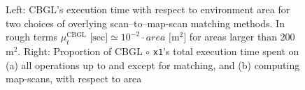 \begin{figure}
  \vspace{0.5cm}
  
  \vspace{0.6cm}
  \caption{\small Left: CBGL's execution time with respect to environment area
           for two choices of overlying scan--to--map-scan matching methods. In
           rough terms $\mu_t^{\text{CBGL}} \text{ [sec]} \simeq 10^{-2}\cdot area
           \text{ [} \text{m}^2 \text{]}$ for areas larger than 200 m$^2$.
           Right: Proportion of CBGL $\circ$ \texttt{x1}'s total execution time
           spent on (a) all operations up to and except for matching, and (b)
           computing map-scans, with respect to area}
  \vspace{-0.2cm}
  \label{fig:c:time_analysis}
\end{figure}

